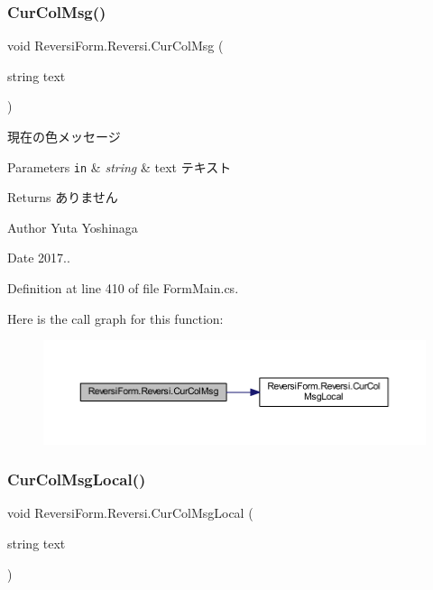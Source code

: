 \subsubsection{\texorpdfstring{Cur\+Col\+Msg()}{CurColMsg()}}
{\footnotesize\ttfamily void Reversi\+Form.\+Reversi.\+Cur\+Col\+Msg (\begin{DoxyParamCaption}\item[{string}]{text }\end{DoxyParamCaption})}



現在の色メッセージ 


\begin{DoxyParams}[1]{Parameters}
\mbox{\tt in}  & {\em string} & text テキスト \\
\hline
\end{DoxyParams}
\begin{DoxyReturn}{Returns}
ありません 
\end{DoxyReturn}
\begin{DoxyAuthor}{Author}
Yuta Yoshinaga 
\end{DoxyAuthor}
\begin{DoxyDate}{Date}
2017.. 
\end{DoxyDate}


Definition at line 410 of file Form\+Main.\+cs.

Here is the call graph for this function\+:\nopagebreak
\begin{figure}[H]
\begin{center}
\leavevmode
\includegraphics[width=350pt]{class_reversi_form_1_1_reversi_ad09577aef8bf515ee495c82a981dfd7d_cgraph}
\end{center}
\end{figure}
\mbox{\label{class_reversi_form_1_1_reversi_a0d919be21fe5961a177e26b5752320b9}} 
\subsubsection{\texorpdfstring{Cur\+Col\+Msg\+Local()}{CurColMsgLocal()}}
{\footnotesize\ttfamily void Reversi\+Form.\+Reversi.\+Cur\+Col\+Msg\+Local (\begin{DoxyParamCaption}\item[{string}]{text }\end{DoxyParamCaption})}



